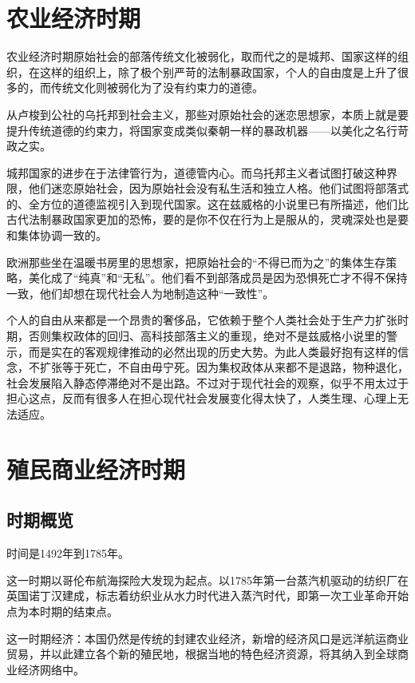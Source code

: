 \documentclass[12pt,oneside]{book}
\begin{document}
\part{农业经济时期}
农业经济时期原始社会的部落传统文化被弱化，取而代之的是城邦、国家这样的组织，在这样的组织上，除了极个别严苛的法制暴政国家，个人的自由度是上升了很多的，而传统文化则被弱化为了没有约束力的道德。

从卢梭到公社的乌托邦到社会主义，那些对原始社会的迷恋思想家，本质上就是要提升传统道德的约束力，将国家变成类似秦朝一样的暴政机器——以美化之名行苛政之实。

城邦国家的进步在于法律管行为，道德管内心。而乌托邦主义者试图打破这种界限，他们迷恋原始社会，因为原始社会没有私生活和独立人格。他们试图将部落式的、全方位的道德监视引入到现代国家。这在兹威格的小说里已有所描述，他们比古代法制暴政国家更加的恐怖，要的是你不仅在行为上是服从的，灵魂深处也是要和集体协调一致的。

欧洲那些坐在温暖书房里的思想家，把原始社会的“不得已而为之”的集体生存策略，美化成了“纯真”和“无私”。他们看不到部落成员是因为恐惧死亡才不得不保持一致，他们却想在现代社会人为地制造这种“一致性”。

个人的自由从来都是一个昂贵的奢侈品，它依赖于整个人类社会处于生产力扩张时期，否则集权政体的回归、高科技部落主义的重现，绝对不是兹威格小说里的警示，而是实在的客观规律推动的必然出现的历史大势。为此人类最好抱有这样的信念，不扩张等于死亡，不自由毋宁死。因为集权政体从来都不是退路，物种退化，社会发展陷入静态停滞绝对不是出路。不过对于现代社会的观察，似乎不用太过于担心这点，反而有很多人在担心现代社会发展变化得太快了，人类生理、心理上无法适应。





\part{殖民商业经济时期}

\chapter{时期概览}
时间是1492年到1785年。

这一时期以哥伦布航海探险大发现为起点。以1785年第一台蒸汽机驱动的纺织厂在英国诺丁汉建成，标志着纺织业从水力时代进入蒸汽时代，即第一次工业革命开始点为本时期的结束点。

这一时期经济：本国仍然是传统的封建农业经济，新增的经济风口是远洋航运商业贸易，并以此建立各个新的殖民地，根据当地的特色经济资源，将其纳入到全球商业经济网络中。
\end{document}
